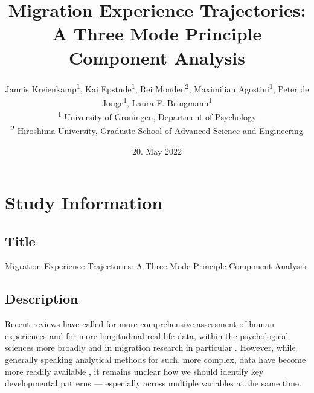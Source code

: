 \documentclass[]{article}
\title{Migration Experience Trajectories: A Three Mode Principle
Component Analysis}
\author{
          Jannis Kreienkamp\textsuperscript{1},
          Kai Epstude\textsuperscript{1},
          Rei Monden\textsuperscript{2},
          Maximilian Agostini\textsuperscript{1},
          Peter de Jonge\textsuperscript{1},
          Laura F.
Bringmann\textsuperscript{1}          \\ \vspace{0.5cm}
              \textsuperscript{1} University of Groningen, Department of
Psychology\\
              \textsuperscript{2} Hiroshima University, Graduate School
of Advanced Science and Engineering      }
\date{20. May 2022}
\newcounter{question}
\begin{document}
\maketitle
\vspace{2pc}


\newcommand\Question[2]{%
   \leavevmode\par
   \stepcounter{question}
   \noindent
   \textbf{\thequestion. #1}. #2\par}

\newcommand\Answer[1]{%
    \noindent
    \textit{Registered response}: #1\par}

\newlength{\mylength}
\setlength{\fboxsep}{15pt}
\setlength{\mylength}{\linewidth}
\addtolength{\mylength}{-2\fboxsep}
\addtolength{\mylength}{-2\fboxrule}

\hypertarget{study-information}{%
\section{Study Information}\label{study-information}}

\hypertarget{title}{%
\subsection{Title}\label{title}}

Migration Experience Trajectories: A Three Mode Principle Component
Analysis

\hypertarget{description}{%
\subsection{Description}\label{description}}

Recent reviews have called for more comprehensive assessment of human
experiences and for more longitudinal real-life data, within the
psychological sciences more broadly and in migration research in
particular
\citep[e.g.,][]{Kreienkamp2022d, MacInnis2015, McKeown2017, Pettigrew2011, Ward2019}.
However, while generally speaking analytical methods for such, more
complex, data have become more readily available
\citep[e.g.,][]{ODonnell2021}, it remains unclear how we should identify
key developmental patterns --- especially across multiple variables at
the same time.
\end{document}
